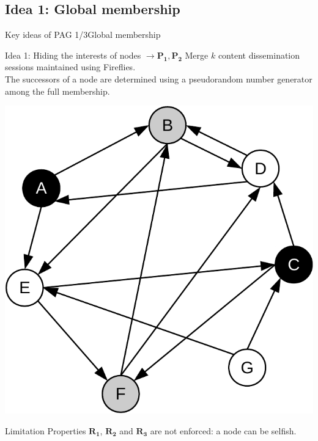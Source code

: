 \documentclass[10pt]{beamer}
\begin{document}
\subsection{Idea 1: Global membership}
\begin{frame}{Key ideas of PAG 1/3}{Global membership}
\minipage[c][0.7\textheight][s]{\textwidth} 
  \begin{block}{Idea 1: Hiding the interests of nodes $\longrightarrow \mathbf{P_1}, \mathbf{P_2}$}
  Merge $k$ content dissemination sessions maintained using Fireflies.\\
  The successors of a node are determined using a pseudorandom number generator among the full membership.
  \end{block}
  
   {
  \begin{center}
     \includegraphics[height=.4\textheight]{fig/PAG/multisessionsExchanges}
  \end{center}
  }
  
   {
    \begin{block}{Limitation}
  Properties $\mathbf{R_1}$, $\mathbf{R_2}$ and $\mathbf{R_3}$ are not enforced: a node can be selfish.  
  \end{block}
  }
  
\endminipage
\end{frame}
\end{document}
